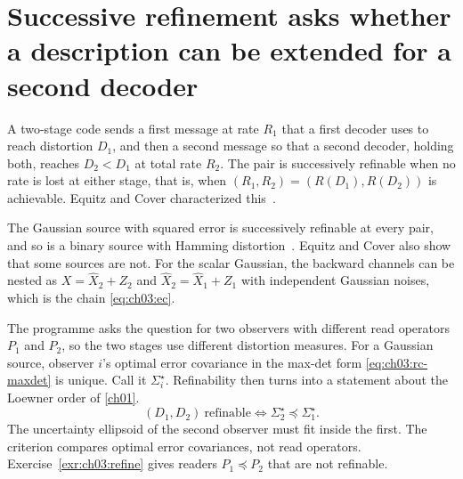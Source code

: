 
\section{Successive refinement asks whether a description can be extended for a second decoder}\label{sec:ch03:refine}

A two-stage code sends a first message at rate $R_1$ that a first decoder uses to reach distortion $D_1$, and then a second message so that a second decoder, holding both, reaches $D_2<D_1$ at total rate $R_2$. The pair is successively refinable when no rate is lost at either stage, that is, when $(R_1,R_2)=(R(D_1),R(D_2))$ is achievable. Equitz and Cover characterized this~\cite{equitzcover1991}.


The Gaussian source with squared error is successively refinable at every pair, and so is a binary source with Hamming distortion~\cite{equitzcover1991}. Equitz and Cover also show that some sources are not. For the scalar Gaussian, the backward channels can be nested as $X=\hat X_2+Z_2$ and $\hat X_2=\hat X_1+Z_1$ with independent Gaussian noises, which is the chain \eqref{eq:ch03:ec}.

The programme asks the question for two observers with different read operators $P_1$ and $P_2$, so the two stages use different distortion measures. For a Gaussian source, observer $i$'s optimal error covariance in the max-det form \eqref{eq:ch03:rc-maxdet} is unique. Call it $\Sigma_i^\star$. Refinability then turns into a statement about the Loewner order of \cref{ch01}.
\begin{equation}\label{eq:ch03:refinable}
(D_1,D_2)\ \text{refinable}\iff \Sigma_2^\star\preceq\Sigma_1^\star .
\end{equation}
The uncertainty ellipsoid of the second observer must fit inside the first. The criterion compares optimal error covariances, not read operators. Exercise~\ref{exr:ch03:refine} gives readers $P_1\preceq P_2$ that are not refinable.

